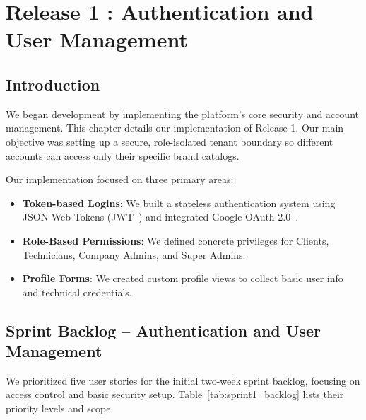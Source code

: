 \documentclass[12pt,a4paper]{report}
\begin{document}
\chapter{Release 1 : Authentication and User Management}

\section{Introduction}

We began development by implementing the platform's core security and account management. This chapter details our implementation of Release 1. Our main objective was setting up a secure, role-isolated tenant boundary so different accounts can access only their specific brand catalogs.

Our implementation focused on three primary areas:
\begin{itemize}
    \item \textbf{Token-based Logins}: We built a stateless authentication system using JSON Web Tokens (JWT~\cite{jwt}) and integrated Google OAuth 2.0~\cite{oauth2}.
    \item \textbf{Role-Based Permissions}: We defined concrete privileges for Clients, Technicians, Company Admins, and Super Admins.
    \item \textbf{Profile Forms}: We created custom profile views to collect basic user info and technical credentials.
\end{itemize}

\section{Sprint Backlog -- Authentication and User Management}

We prioritized five user stories for the initial two-week sprint backlog, focusing on access control and basic security setup. Table~\ref{tab:sprint1_backlog} lists their priority levels and scope.

\renewcommand{\arraystretch}{1.3}
\setlength{\tabcolsep}{8pt}

\begin{table}[!htbp]
\centering
\caption{User stories for Release 1 (Authentication and User Management)}
\label{tab:sprint1_backlog}
\end{table}
\end{document}
